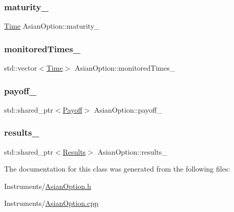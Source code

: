 \hypertarget{class_asian_option_aff2f0be31b55a1b859cde9ee9b339075}{}\label{class_asian_option_aff2f0be31b55a1b859cde9ee9b339075} 
\subsubsection{\texorpdfstring{maturity\+\_\+}{maturity\_}}
{\footnotesize\ttfamily \hyperlink{_name_def_8h_ac2d3e0ba793497bcca555c7c2cf64ff3}{Time} Asian\+Option\+::maturity\+\_\+\hspace{0.3cm}{\ttfamily [private]}}

\hypertarget{class_asian_option_a8cc25f4cabd8ceac95a69598481f18c8}{}\label{class_asian_option_a8cc25f4cabd8ceac95a69598481f18c8} 
\subsubsection{\texorpdfstring{monitored\+Times\+\_\+}{monitoredTimes\_}}
{\footnotesize\ttfamily std\+::vector$<$\hyperlink{_name_def_8h_ac2d3e0ba793497bcca555c7c2cf64ff3}{Time}$>$ Asian\+Option\+::monitored\+Times\+\_\+\hspace{0.3cm}{\ttfamily [private]}}

\hypertarget{class_asian_option_abb0ef9b7f812435dcf24e4dd8edb2be2}{}\label{class_asian_option_abb0ef9b7f812435dcf24e4dd8edb2be2} 
\subsubsection{\texorpdfstring{payoff\+\_\+}{payoff\_}}
{\footnotesize\ttfamily std\+::shared\+\_\+ptr$<$\hyperlink{class_payoff}{Payoff}$>$ Asian\+Option\+::payoff\+\_\+\hspace{0.3cm}{\ttfamily [private]}}

\hypertarget{class_asian_option_aea29a8aff78cbe4101b4f060cedb6307}{}\label{class_asian_option_aea29a8aff78cbe4101b4f060cedb6307} 
\subsubsection{\texorpdfstring{results\+\_\+}{results\_}}
{\footnotesize\ttfamily std\+::shared\+\_\+ptr$<$\hyperlink{class_asian_option_1_1_results}{Results}$>$ Asian\+Option\+::results\+\_\+\hspace{0.3cm}{\ttfamily [private]}}



The documentation for this class was generated from the following files\+:\begin{DoxyCompactItemize}
\item 
Instruments/\hyperlink{_asian_option_8h}{Asian\+Option.\+h}\item 
Instruments/\hyperlink{_asian_option_8cpp}{Asian\+Option.\+cpp}\end{DoxyCompactItemize}
